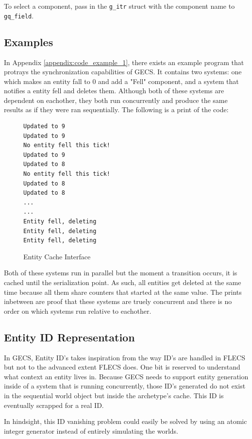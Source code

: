 To select a component, pass in the \texttt{g\_itr} struct with the component name to \texttt{gq\_field}. 

\subsection{Examples}
In Appendix \ref{appendix:code_example_1}, there exists an example program that protrays the synchronization capabilities of GECS. It contains two systems: one which makes an entity fall to 0 and add a "Fell" component, and a system that notifies a entity fell and deletes them. Although both of these systems are dependent on eachother, they both run concurrently and produce the same results as if they were ran sequentially. The following is a print of the code:

\begin{figure}[H]
    \begin{verbatim}
Updated to 9
Updated to 9
No entity fell this tick!                            
Updated to 9
Updated to 8
No entity fell this tick!                            
Updated to 8
Updated to 8
...
...
Entity fell, deleting
Entity fell, deleting
Entity fell, deleting
\end{verbatim}
\caption{Entity Cache Interface}
\label{code:component_retrieval}
\end{figure}

Both of these systems run in parallel but the moment a transition occurs, it is cached until the serialization point. As such, all entities get deleted at the same time because all them share counters that started at the same value. The prints inbetween are proof that these systems are truely concurrent and there is no order on which systems run relative to eachother.

\subsection{Entity ID Representation}
In GECS, Entity ID's takes inspiration from the way ID's are handled in FLECS but not to the advanced extent FLECS does. One bit is reserved to understand what context an entity lives in. Because GECS needs to support entity generation inside of a system that is running concurrently, those ID's generated do not exist in the sequential world object but inside the archetype's cache. This ID is eventually scrapped for a real ID. 

In hindsight, this ID vanishing problem could easily be solved by using an atomic integer generator instead of entirely simulating the worlds. 


